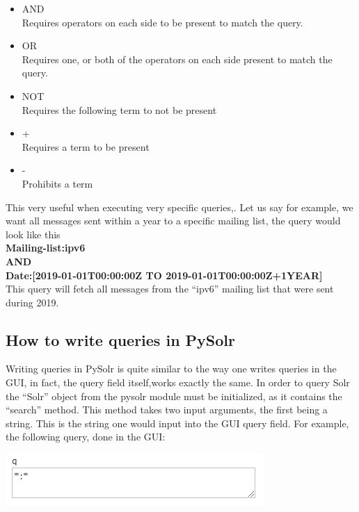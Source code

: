 \documentclass[a4paper,english]{report}
\begin{document}
\begin{itemize}
\item AND\\
 Requires operators on each side to be present to match the query.

\item OR\\
Requires one, or both of the operators on each side present to match the query.


\item NOT \\
Requires the following term to not be present 


\item + \\
Requires a term to be present 

\item - \\
Prohibits a term 

\end{itemize}

This very useful when executing very specific queries,. Let us say for example, we want all messages sent within a year to a specific mailing list, the query would look like this\\

\noindent
\textbf{Mailing-list:ipv6\\ AND\\ Date:[2019-01-01T00:00:00Z TO 2019-01-01T00:00:00Z+1YEAR]}\\

This query will fetch all messages from the “ipv6” mailing list that were sent during 2019.






\subsection{How to write queries in PySolr}

Writing queries in PySolr is quite similar to the way one writes queries in the GUI, in fact, the query field itself,works exactly the same. In order to query Solr the “Solr” object from the pysolr module must be initialized, as it contains the “search” method. This method takes two input arguments, the first being a string. This is the string one would input into the GUI query field.
For example, the following query, done in the GUI:

\includegraphics{gui1}
\end{document}
